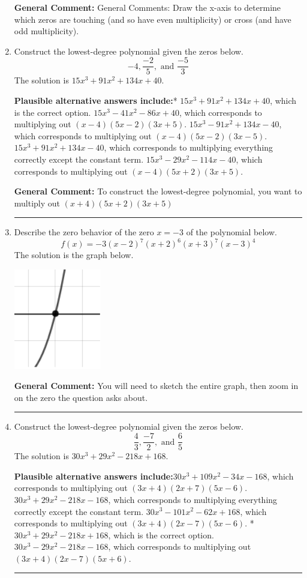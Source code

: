 \documentclass{extbook}[14pt]
\newcommand{\litem}[1]{\item #1

\rule{\textwidth}{0.4pt}}
\begin{document}
\begin{enumerate}
{\textbf{General Comment:} General Comments: Draw the x-axis to determine which zeros are touching (and so have even multiplicity) or cross (and have odd multiplicity).
}
\litem{
Construct the lowest-degree polynomial given the zeros below.
\[ -4, \frac{-2}{5}, \text{ and } \frac{-5}{3} \]The solution is \( 15x^{3} +91 x^{2} +134 x + 40 \).\begin{enumerate}[label=\Alph*.]
\textbf{Plausible alternative answers include:}* $15x^{3} +91 x^{2} +134 x + 40$, which is the correct option.
$15x^{3} -41 x^{2} -86 x + 40$, which corresponds to multiplying out $(x -4)(5x -2)(3x + 5)$.
$15x^{3} -91 x^{2} +134 x -40$, which corresponds to multiplying out $(x -4)(5x -2)(3x -5)$.
$15x^{3} +91 x^{2} +134 x -40$, which corresponds to multiplying everything correctly except the constant term.
$15x^{3} -29 x^{2} -114 x -40$, which corresponds to multiplying out $(x -4)(5x + 2)(3x + 5)$.
\end{enumerate}

\textbf{General Comment:} To construct the lowest-degree polynomial, you want to multiply out $(x + 4)(5x + 2)(3x + 5)$
}
\litem{
Describe the zero behavior of the zero $x = -3$ of the polynomial below.
\[ f(x) = -3(x - 2)^{7}(x + 2)^{6}(x + 3)^{7}(x - 3)^{4} \]The solution is the graph below.
    \begin{center}
        \includegraphics[width=0.3\textwidth]{../Figures/polyZeroBehaviorCopyDA.png}
    \end{center}

\textbf{General Comment:} You will need to sketch the entire graph, then zoom in on the zero the question asks about.
}
\litem{
Construct the lowest-degree polynomial given the zeros below.
\[ \frac{4}{3}, \frac{-7}{2}, \text{ and } \frac{6}{5} \]The solution is \( 30x^{3} +29 x^{2} -218 x + 168 \).\begin{enumerate}[label=\Alph*.]
\textbf{Plausible alternative answers include:}$30x^{3} +109 x^{2} -34 x -168$, which corresponds to multiplying out $(3x + 4)(2x + 7)(5x -6)$.
$30x^{3} +29 x^{2} -218 x -168$, which corresponds to multiplying everything correctly except the constant term.
$30x^{3} -101 x^{2} -62 x + 168$, which corresponds to multiplying out $(3x + 4)(2x -7)(5x -6)$.
* $30x^{3} +29 x^{2} -218 x + 168$, which is the correct option.
$30x^{3} -29 x^{2} -218 x -168$, which corresponds to multiplying out $(3x + 4)(2x -7)(5x + 6)$.
\end{enumerate}

}
\end{enumerate}
\end{document}
